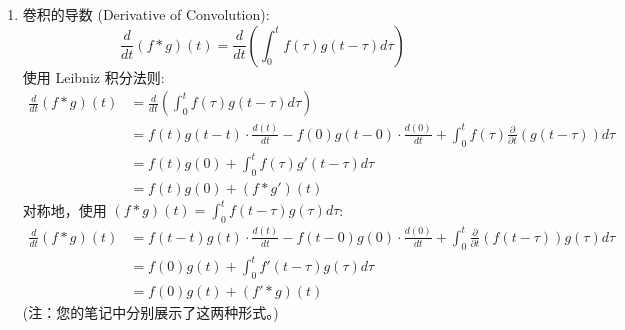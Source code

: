 \documentclass[linespread=1.5,openany]{book}%
\def\diff{d}%
\theoremstyle{plain}
\newcommand{\diff}{\mathop{}\!\mathrm{d}}  %
\begin{document}
{{{{{{\begin{enumerate}[label=(\arabic*)]
									\item 卷积的导数 (Derivative of Convolution):
									\[ \frac{\diff}{\diff t} (f*g)(t) = \frac{\diff}{\diff t} \left( \int_{0}^{t} f(\tau)g(t-\tau) \diff \tau \right) \]
									使用 Leibniz 积分法则:
									\begin{align}
										\frac{\diff}{\diff t} (f*g)(t) &= \frac{\diff}{\diff t} \left( \int_{0}^{t} f(\tau)g(t-\tau) \diff \tau \right)\nonumber \\
										&= f(t)g(t-t) \cdot \frac{\diff (t)}{\diff t} - f(0)g(t-0) \cdot \frac{\diff (0)}{\diff t} + \int_{0}^{t} f(\tau) \frac{\partial}{\partial t} (g(t-\tau)) \diff \tau \nonumber \\
										&= f(t)g(0) + \int_{0}^{t} f(\tau) g'(t-\tau) \diff \tau \nonumber \\
										&= f(t)g(0) + (f*g')(t) \label{eq:L15_conv_deriv_form1}
									\end{align}
									对称地，使用 $(f*g)(t) = \int_0^t f(t-\tau)g(\tau)\diff \tau$:
									\begin{align}
										\frac{\diff}{\diff t} (f*g)(t) &= f(t-t)g(t) \cdot \frac{\diff (t)}{\diff t} - f(t-0)g(0) \cdot \frac{\diff (0)}{\diff t} + \int_0^t \frac{\partial}{\partial t}(f(t-\tau))g(\tau)\diff \tau \nonumber \\
										&= f(0)g(t) + \int_0^t f'(t-\tau)g(\tau)\diff \tau \nonumber \\
										&= f(0)g(t) + (f'*g)(t) \label{eq:L15_conv_deriv_form2}
									\end{align}
									(注：您的笔记中分别展示了这两种形式。)
									

\end{enumerate}}}}}}}
\end{document}
